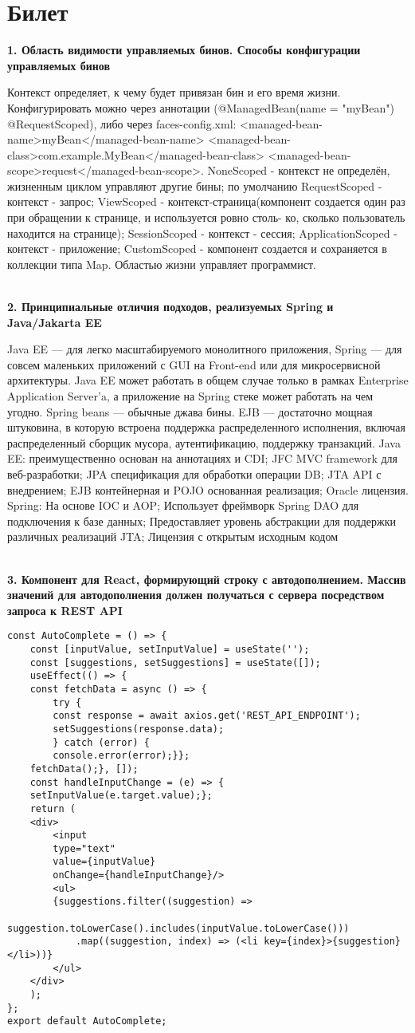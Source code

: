 \documentclass{article}
\newcommand{\bil}[5]{%
        \section{Билет}
        \textbf{1. #1}

        #4
        \\
        \textbf{2. #2}
        
        #5
        \\
        \textbf{3. #3}
}
\begin{document}
\bil{Область видимости управляемых бинов. Способы конфигурации управляемых бинов}{Принципиальные отличия подходов, реализуемых Spring и Java/Jakarta EE}{Компонент для React, формирующий строку с автодополнением. Массив значений для автодополнения должен получаться с сервера посредством запроса к REST API}{
    Контекст определяет, к чему будет привязан бин и его время жизни. 
    Конфигурировать можно через аннотации (@ManagedBean(name = "myBean") @RequestScoped), либо через faces-config.xml: 
    <managed-bean-name>myBean</managed-bean-name>
    <managed-bean-class>com.example.MyBean</managed-bean-class>
    <managed-bean-scope>request</managed-bean-scope>. 
    NoneScoped - контекст не определён, жизненным циклом управляют другие бины; по умолчанию RequestScoped - контекст - запрос; 
    ViewScoped - контекст-страница(компонент создается один раз при обращении к странице, и используется ровно столь- ко, сколько пользователь находится на странице); 
    SessionScoped - контекст - сессия; ApplicationScoped - контекст - приложение; 
    CustomScoped - компонент создается и сохраняется в коллекции типа Map. Областью жизни управляет программист.
}{
    Java EE — для легко масштабируемого монолитного приложения, Spring — для совсем маленьких приложений с GUI на Front-end или для микросервисной архитектуры.
    Java EE может работать в общем случае только в рамках Enterprise Application Server’a, а приложение на Spring стеке может работать на чем угодно.
    Spring beans — обычные джава бины. EJB — достаточно мощная штуковина, в которую встроена поддержка распределенного исполнения, 
    включая распределенный сборщик мусора, аутентификацию, поддержку транзакций. 
    Java EE:
    преимущественно основан на аннотациях и CDI;
    JFC MVC framework для веб-разработки;
    JPA спецификация для обработки операции DB;
    JTA API с внедрением;
    EJB контейнерная и POJO основанная реализация;
    Oracle лицензия.
    Spring: На основе IOC и AOP;
    Использует фреймворк Spring DAO для подключения к базе данных;
    Предоставляет уровень абстракции для поддержки различных реализаций JTA;
Лицензия с открытым исходным кодом
}
\begin{lstlisting}[frame=single, basicstyle=\ttfamily, breaklines=true, breakatwhitespace=true, postbreak=\mbox{\textcolor{red}{$\hookrightarrow$}\space}]
const AutoComplete = () => {
    const [inputValue, setInputValue] = useState('');
    const [suggestions, setSuggestions] = useState([]);
    useEffect(() => {
    const fetchData = async () => {
        try {
        const response = await axios.get('REST_API_ENDPOINT');
        setSuggestions(response.data);
        } catch (error) {
        console.error(error);}};
    fetchData();}, []); 
    const handleInputChange = (e) => {
    setInputValue(e.target.value);};
    return (
    <div>
        <input
        type="text"
        value={inputValue}
        onChange={handleInputChange}/>
        <ul>
        {suggestions.filter((suggestion) =>
            suggestion.toLowerCase().includes(inputValue.toLowerCase()))
            .map((suggestion, index) => (<li key={index}>{suggestion}</li>))}
        </ul>
    </div>
    );
};
export default AutoComplete;    
\end{lstlisting}
\end{document}
